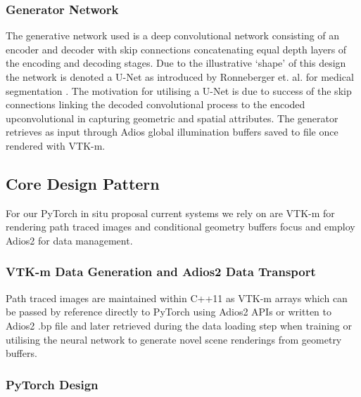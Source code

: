 \documentclass[sigconf]{acmart}%
\begin{document}
\subsubsection{Generator Network}

The generative network used is a deep convolutional network consisting of an encoder and decoder with skip connections concatenating equal depth layers of the encoding and decoding stages. Due to the illustrative `shape' of this design the network is denoted a U-Net as introduced by Ronneberger et. al. for medical segmentation \cite{ronnebergerUnet}. The motivation for utilising a U-Net is due to success of the skip connections linking the decoded convolutional process to the encoded upconvolutional in capturing geometric and spatial attributes. The generator retrieves as input through Adios global illumination buffers saved to file once rendered with VTK-m. 

\subsection{Core Design Pattern}

For our PyTorch in situ proposal current systems we rely on are VTK-m for rendering path traced images and conditional geometry buffers focus and employ Adios2 for data management. 

\subsubsection{VTK-m Data Generation and Adios2 Data Transport}

Path traced images are maintained within C++11 as VTK-m arrays which can be passed by reference directly to PyTorch using Adios2 APIs or written to Adios2 .bp file and later retrieved during the data loading step when training or utilising the neural network to generate novel scene renderings from geometry buffers. 

\subsubsection{PyTorch Design}
\end{document}
